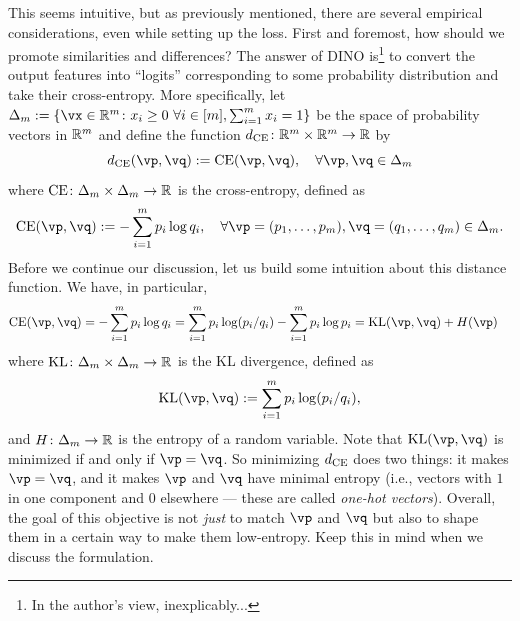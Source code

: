 \documentclass[../../book-main.tex]{subfiles}
\begin{document}
This seems intuitive, but as previously mentioned, there are several empirical considerations, even while setting up the loss. First and foremost, how should we promote similarities and differences? The answer of DINO \citep{caron2021emerging} is\footnote{In the author's view, inexplicably...} to convert the output features into ``logits'' corresponding to some probability distribution and take their cross-entropy. More specifically, let \(\Delta_{m} := \{\vx \in \R^{m} \colon x_{i} \geq 0\ \forall i \in [m], \sum_{i = 1}^{m}x_{i} = 1\}\) be the space of probability vectors in \(\mathbb{R}^{m}\) and define the function \(d_{\operatorname{CE}} \colon \mathbb{R}^{m} \times \mathbb{R}^{m} \to \mathbb{R}\) by
 \begin{equation}\label{eq:cross_entropy_difference}
    d_{\CE}(\vp, \vq) := \CE(\vp, \vq), \quad \forall \vp, \vq \in \Delta_{m}
 \end{equation}
 where \(\operatorname{CE} \colon \Delta_{m} \times \Delta_{m} \to \mathbb{R}\) is the cross-entropy, defined as 
 \begin{equation}\label{eq:expts_def_ce}
    \CE(\vp, \vq) := -\sum_{i = 1}^{m}p_{i}\log q_{i}, \quad \forall \vp = (p_{1}, \dots, p_{m}), \vq = (q_{1}, \dots, q_{m}) \in \Delta_{m}.
 \end{equation}
 Before we continue our discussion, let us build some intuition about this distance function. We have, in particular,
 \begin{align}
    \CE(\vp, \vq)
    &= -\sum_{i = 1}^{m}p_{i}\log q_{i} = \sum_{i = 1}^{m}p_{i}\log(p_{i}/q_{i}) - \sum_{i = 1}^{m}p_{i}\log p_{i} = \KL(\vp, \vq) + H(\vp)
 \end{align}
 where \(\operatorname{KL} \colon \Delta_{m} \times \Delta_{m} \to \mathbb{R}\) is the KL divergence, defined as 
 \begin{equation}
    \KL(\vp, \vq) := \sum_{i = 1}^{m}p_{i}\log(p_{i}/q_{i}),
 \end{equation}
 and \(H \colon \Delta_{m} \to \mathbb{R}\) is the entropy of a random variable. Note that \(\KL(\vp, \vq)\) is minimized if and only if \(\vp = \vq\). So minimizing \(d_{\operatorname{CE}}\) does two things: it makes \(\vp = \vq\), and it makes \(\vp\) and \(\vq\) have minimal entropy (i.e., vectors with \(1\) in one component and \(0\) elsewhere --- these are called \textit{one-hot vectors}). Overall, the goal of this objective is not \textit{just} to match \(\vp\) and \(\vq\) but also to shape them in a certain way to make them low-entropy. Keep this in mind when we discuss the formulation.
\end{document}
